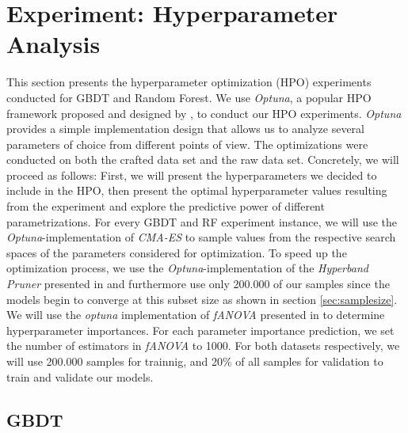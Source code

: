 \section{Experiment: Hyperparameter Analysis}\label{sec:hpo}
This section presents the hyperparameter optimization (HPO) experiments conducted for GBDT and Random Forest. 
We use \textit{Optuna}, a popular HPO framework proposed and designed by \cite{akiba2019optuna}, to conduct our HPO experiments. 
\textit{Optuna} provides a simple implementation design that allows us to analyze several parameters of choice from different points of view. 
The optimizations were conducted on both the crafted data set and the raw data set. 
Concretely, we will proceed as follows: First, we will present the hyperparameters we decided to include in the HPO, then present the optimal hyperparameter values resulting from the experiment and explore the predictive power of different parametrizations. 
For every GBDT and RF experiment instance, we will use the \textit{Optuna}-implementation of \textit{CMA-ES} to sample values from the respective search spaces of the parameters considered for optimization. To speed up the optimization process, we use the \textit{Optuna}-implementation of the \textit{Hyperband Pruner} presented in \cite{li2018hyperband} and furthermore use only 200.000 of our samples since the models begin to converge at this subset size as shown in section \ref{sec:samplesize}. 
We will use the \textit{optuna} implementation of \textit{fANOVA} presented in \cite{fANOVA} to determine hyperparameter importances. 
For each parameter importance prediction, we set the number of estimators in \textit{fANOVA} to 1000.
For both datasets respectively, we will use 200.000 samples for trainnig, and 20\% of all samples for validation to train and validate our models.
\subsection{GBDT}


